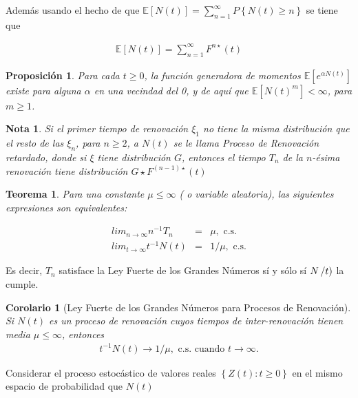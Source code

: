 \documentclass{article}
\newtheorem{Teo}{Teorema}[section]
\newtheorem{Note}{Nota}[section]
\newtheorem{Prop}{Proposición}[section]
\newtheorem{Coro}{Corolario}[section]
\newcommand{\esp}{\mathbb{E}}
\numberwithin{equation}{section}
\begin{document}
Adem\'as usando el hecho de que $\esp\left[N\left(t\right)\right]=\sum_{n=1}^{\infty}P\left\{N\left(t\right)\geq n\right\}$
se tiene que

\begin{eqnarray*}
\esp\left[N\left(t\right)\right]=\sum_{n=1}^{\infty}F^{n\star}\left(t\right)
\end{eqnarray*}

\begin{Prop}
Para cada $t\geq0$, la funci\'on generadora de momentos $\esp\left[e^{\alpha N\left(t\right)}\right]$ existe para alguna $\alpha$ en una vecindad del 0, y de aqu\'i que $\esp\left[N\left(t\right)^{m}\right]<\infty$, para $m\geq1$.
\end{Prop}


\begin{Note}
Si el primer tiempo de renovaci\'on $\xi_{1}$ no tiene la misma distribuci\'on que el resto de las $\xi_{n}$, para $n\geq2$, a $N\left(t\right)$ se le llama Proceso de Renovaci\'on retardado, donde si $\xi$ tiene distribuci\'on $G$, entonces el tiempo $T_{n}$ de la $n$-\'esima renovaci\'on tiene distribuci\'on $G\star F^{\left(n-1\right)\star}\left(t\right)$
\end{Note}


\begin{Teo}
Para una constante $\mu\leq\infty$ ( o variable aleatoria), las siguientes expresiones son equivalentes:

\begin{eqnarray}
lim_{n\rightarrow\infty}n^{-1}T_{n}&=&\mu,\textrm{ c.s.}\\
lim_{t\rightarrow\infty}t^{-1}N\left(t\right)&=&1/\mu,\textrm{ c.s.}
\end{eqnarray}
\end{Teo}


Es decir, $T_{n}$ satisface la Ley Fuerte de los Grandes N\'umeros s\'i y s\'olo s\'i $N\left/t\right)$ la cumple.


\begin{Coro}[Ley Fuerte de los Grandes N\'umeros para Procesos de Renovaci\'on]
Si $N\left(t\right)$ es un proceso de renovaci\'on cuyos tiempos de inter-renovaci\'on tienen media $\mu\leq\infty$, entonces
\begin{eqnarray}
t^{-1}N\left(t\right)\rightarrow 1/\mu,\textrm{ c.s. cuando }t\rightarrow\infty.
\end{eqnarray}

\end{Coro}


Considerar el proceso estoc\'astico de valores reales $\left\{Z\left(t\right):t\geq0\right\}$ en el mismo espacio de probabilidad que $N\left(t\right)$
\end{document}
